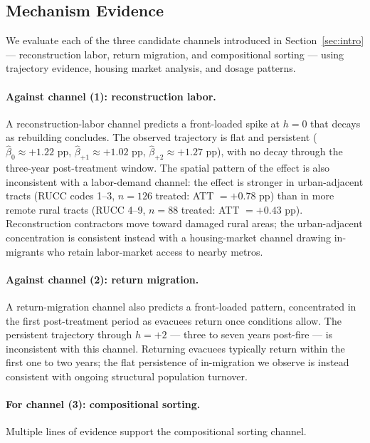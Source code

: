 \documentclass[12pt]{article}
\begin{document}
\subsection{Mechanism Evidence}
\label{sec:mechanism}

We evaluate each of the three candidate channels introduced in
Section~\ref{sec:intro} --- reconstruction labor, return migration,
and compositional sorting --- using trajectory evidence, housing market
analysis, and dosage patterns.

\paragraph{Against channel (1): reconstruction labor.}
A reconstruction-labor channel predicts a front-loaded spike at $h = 0$
that decays as rebuilding concludes.
The observed trajectory is flat and persistent
($\hat{\beta}_0 \approx +1.22$ pp, $\hat{\beta}_{+1} \approx +1.02$ pp,
$\hat{\beta}_{+2} \approx +1.27$ pp), with no decay through the three-year
post-treatment window.
The spatial pattern of the effect is also inconsistent with a labor-demand
channel: the effect is stronger in urban-adjacent tracts
(RUCC codes 1--3, $n = 126$ treated: ATT $= +0.78$ pp)
than in more remote rural tracts (RUCC 4--9, $n = 88$ treated: ATT $= +0.43$ pp).
Reconstruction contractors move toward damaged rural areas; the
urban-adjacent concentration is consistent instead with a housing-market
channel drawing in-migrants who retain labor-market access to nearby metros.

\paragraph{Against channel (2): return migration.}
A return-migration channel also predicts a front-loaded pattern,
concentrated in the first post-treatment period as evacuees return
once conditions allow.
The persistent trajectory through $h = +2$ --- three to seven years
post-fire --- is inconsistent with this channel.
Returning evacuees typically return within the first one to two years;
the flat persistence of in-migration we observe is instead consistent with
ongoing structural population turnover.

\paragraph{For channel (3): compositional sorting.}
Multiple lines of evidence support the compositional sorting channel.
\end{document}
